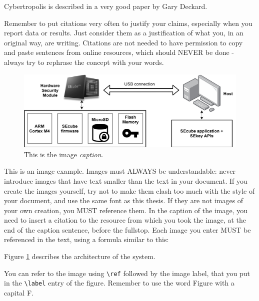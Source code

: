 \begin{center}
Cybertropolis \cite{deckard2018cybertropolis} is described in a very good paper by Gary Deckard.
\end{center}

Remember to put citations very often to justify your claims, especially when you report data or results. Just consider them as a justification of what you, in an original way, are writing. Citations are not needed to have permission to copy and paste sentences from online resources, which should NEVER be done - always try to rephrase the concept with your words.

\begin{figure}[h!]
\vspace{0.5cm}
\includegraphics[width=\textwidth]{images/simplearch.jpg}
\caption{This is the image \emph{caption}.}
\label{fig:generalschema} %
\end{figure}

This is an image example. Images must ALWAYS be understandable: never introduce images that have text smaller than the text in your document. If you create the images yourself, try not to make them clash too much with the style of your document, and use the same font as this thesis.
If they are not images of your own creation, you MUST reference them. In the caption of the image, you need to insert a citation to the resource from which you took the image, at the end of the caption sentence, before the fullstop.
Each image you enter MUST be referenced in the text, using a formula similar to this:

\begin{center}
Figure \ref{fig:generalschema} describes the architecture of the system.
\end{center}

You can refer to the image using \lstinline{\ref} followed by the image label, that you put in the \lstinline{\label} entry of the figure. Remember to use the word Figure with a capital F. 

